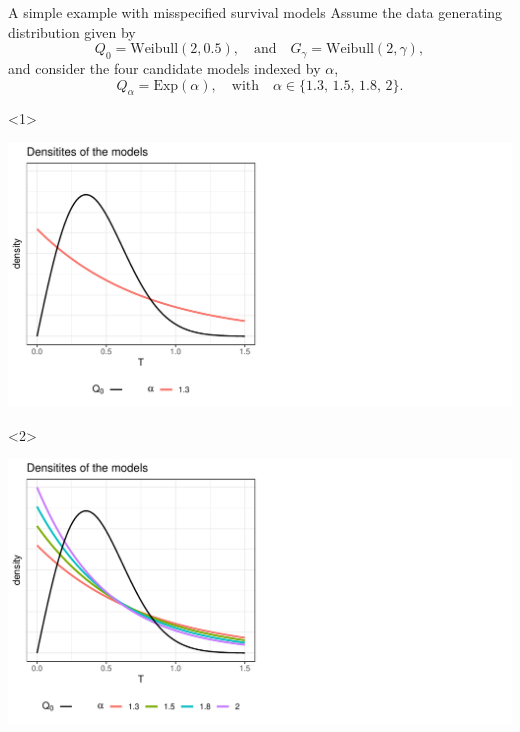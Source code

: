 \documentclass[smaller]{beamer}\usepackage{listings}
\begin{document}
\begin{frame}[label={sec:org2cc3300}]{A simple example with misspecified survival models}
\small Assume the data generating distribution given by
\begin{equation*}
  Q_0 = \text{Weibull}(2,  0.5),
  \quad \text{and} \quad
  G_{\gamma} = \text{Weibull}(2,\gamma),
\end{equation*}
and consider the four candidate models indexed by $\alpha$,
\begin{equation*}
  Q_{\alpha} = \text{Exp}(\alpha),
  \quad \text{with} \quad 
  \alpha \in \{1.3, \,1.5,\, 1.8,\, 2\}.
\end{equation*}

\vfill

\begin{onlyenv}<1>
\begin{center}
\includegraphics[width=.9\linewidth]{fig-mix-const-v1.pdf}
\end{center}
\end{onlyenv}

\begin{onlyenv}<2>
\begin{center}
\includegraphics[width=.9\linewidth]{fig-mix-const-v2.pdf}
\end{center}
\end{onlyenv}


\end{frame}
\end{document}

